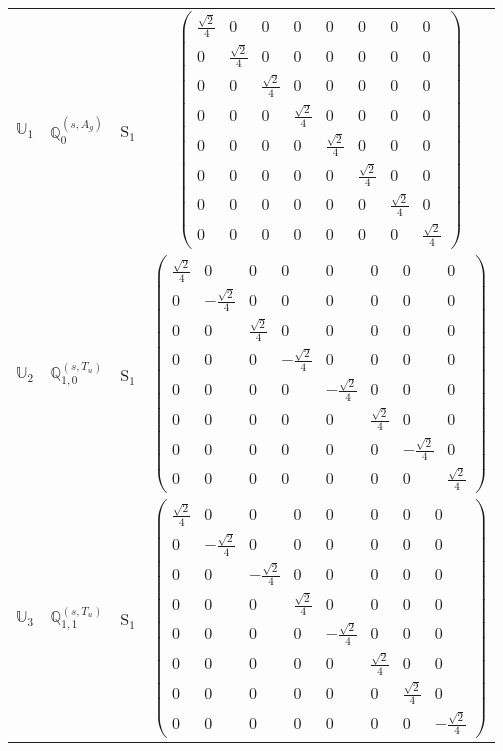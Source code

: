 \documentclass[fleqn,10pt,landscape]{article}
\begin{document}
\begin{itemize}
\begin{center}
\begin{longtable}{c|c|c|c}
$ \mathbb{U}_{1} $ & $\mathbb{Q}_{0}^{(s,A_{g})}$ & S$_{1}$ & $\begin{pmatrix} \frac{\sqrt{2}}{4} & 0 & 0 & 0 & 0 & 0 & 0 & 0 \\ 0 & \frac{\sqrt{2}}{4} & 0 & 0 & 0 & 0 & 0 & 0 \\ 0 & 0 & \frac{\sqrt{2}}{4} & 0 & 0 & 0 & 0 & 0 \\ 0 & 0 & 0 & \frac{\sqrt{2}}{4} & 0 & 0 & 0 & 0 \\ 0 & 0 & 0 & 0 & \frac{\sqrt{2}}{4} & 0 & 0 & 0 \\ 0 & 0 & 0 & 0 & 0 & \frac{\sqrt{2}}{4} & 0 & 0 \\ 0 & 0 & 0 & 0 & 0 & 0 & \frac{\sqrt{2}}{4} & 0 \\ 0 & 0 & 0 & 0 & 0 & 0 & 0 & \frac{\sqrt{2}}{4} \end{pmatrix}$ \\
$ \mathbb{U}_{2} $ & $\mathbb{Q}_{1,0}^{(s,T_{u})}$ & S$_{1}$ & $\begin{pmatrix} \frac{\sqrt{2}}{4} & 0 & 0 & 0 & 0 & 0 & 0 & 0 \\ 0 & - \frac{\sqrt{2}}{4} & 0 & 0 & 0 & 0 & 0 & 0 \\ 0 & 0 & \frac{\sqrt{2}}{4} & 0 & 0 & 0 & 0 & 0 \\ 0 & 0 & 0 & - \frac{\sqrt{2}}{4} & 0 & 0 & 0 & 0 \\ 0 & 0 & 0 & 0 & - \frac{\sqrt{2}}{4} & 0 & 0 & 0 \\ 0 & 0 & 0 & 0 & 0 & \frac{\sqrt{2}}{4} & 0 & 0 \\ 0 & 0 & 0 & 0 & 0 & 0 & - \frac{\sqrt{2}}{4} & 0 \\ 0 & 0 & 0 & 0 & 0 & 0 & 0 & \frac{\sqrt{2}}{4} \end{pmatrix}$ \\
$ \mathbb{U}_{3} $ & $\mathbb{Q}_{1,1}^{(s,T_{u})}$ & S$_{1}$ & $\begin{pmatrix} \frac{\sqrt{2}}{4} & 0 & 0 & 0 & 0 & 0 & 0 & 0 \\ 0 & - \frac{\sqrt{2}}{4} & 0 & 0 & 0 & 0 & 0 & 0 \\ 0 & 0 & - \frac{\sqrt{2}}{4} & 0 & 0 & 0 & 0 & 0 \\ 0 & 0 & 0 & \frac{\sqrt{2}}{4} & 0 & 0 & 0 & 0 \\ 0 & 0 & 0 & 0 & - \frac{\sqrt{2}}{4} & 0 & 0 & 0 \\ 0 & 0 & 0 & 0 & 0 & \frac{\sqrt{2}}{4} & 0 & 0 \\ 0 & 0 & 0 & 0 & 0 & 0 & \frac{\sqrt{2}}{4} & 0 \\ 0 & 0 & 0 & 0 & 0 & 0 & 0 & - \frac{\sqrt{2}}{4} \end{pmatrix}$ \\

\end{longtable}
\end{center}
\end{itemize}
\end{document}
